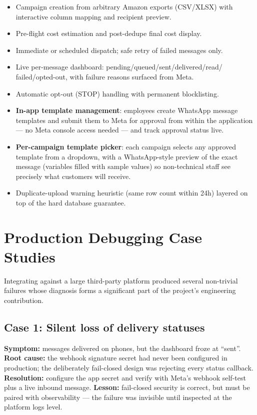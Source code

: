 \documentclass[11pt,a4paper]{article}
\begin{document}
\begin{itemize}[nosep]
  \item Campaign creation from arbitrary Amazon exports (CSV/XLSX) with
        interactive column mapping and recipient preview.
  \item Pre-flight cost estimation and post-dedupe final cost display.
  \item Immediate or scheduled dispatch; safe retry of failed messages only.
  \item Live per-message dashboard: pending/queued/sent/delivered/read/%
        failed/opted-out, with failure reasons surfaced from Meta.
  \item Automatic opt-out (STOP) handling with permanent blocklisting.
  \item \textbf{In-app template management}: employees create WhatsApp
        message templates and submit them to Meta for approval from within
        the application --- no Meta console access needed --- and track
        approval status live.
  \item \textbf{Per-campaign template picker}: each campaign selects any
        approved template from a dropdown, with a WhatsApp-style preview
        of the exact message (variables filled with sample values) so
        non-technical staff see precisely what customers will receive.
  \item Duplicate-upload warning heuristic (same row count within 24h)
        layered on top of the hard database guarantee.
\end{itemize}

\section{Production Debugging Case Studies}

Integrating against a large third-party platform produced several
non-trivial failures whose diagnosis forms a significant part of the
project's engineering contribution.

\subsection{Case 1: Silent loss of delivery statuses}
\textbf{Symptom:} messages delivered on phones, but the dashboard froze at
``sent''. \textbf{Root cause:} the webhook signature secret had never been
configured in production; the deliberately fail-closed design was
rejecting every status callback. \textbf{Resolution:} configure the app
secret and verify with Meta's webhook self-test plus a live inbound
message. \textbf{Lesson:} fail-closed security is correct, but must be
paired with observability --- the failure was invisible until inspected at
the platform logs level.
\end{document}
